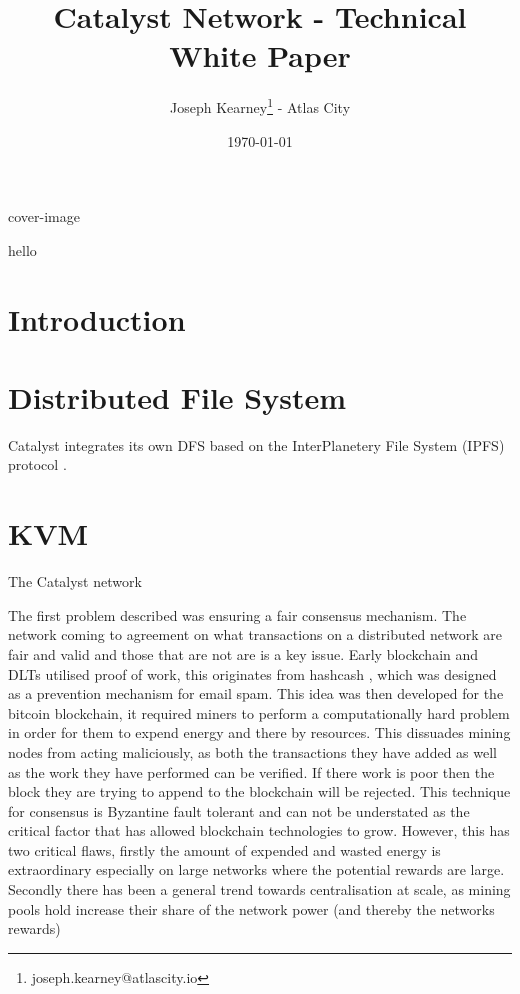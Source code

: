 \documentclass{article}
\title{\textbf{Catalyst Network - Technical White Paper}}
\date{\today}
\author{Joseph Kearney\thanks{joseph.kearney@atlascity.io} - Atlas City}
\begin{document}
 {cover-image}

\maketitle

\abstract 

hello

\newpage

{
  \hypersetup{linkcolor=black}
  \tableofcontents
}
\newpage

\section*{Introduction}

\section{Distributed File System}

Catalyst integrates its own DFS based on the InterPlanetery File System (IPFS) protocol \cite{benet2014ipfs}.

\section{KVM}

The Catalyst network 

The first problem described was ensuring a fair consensus mechanism. The network coming to agreement on what transactions on a distributed network are fair and valid and those that are not are is a key issue. Early blockchain and DLTs utilised proof of work, this originates from hashcash \cite{back2002hashcash}, which was designed as a prevention mechanism for email spam. This idea was then developed for the bitcoin blockchain, it required miners to perform a computationally hard problem in order for them to expend energy and there by resources. This dissuades mining nodes from acting maliciously, as both the transactions they have added as well as the work they have performed can be verified. If there work is poor then the block they are trying to append to the blockchain will be rejected. This technique for consensus is Byzantine fault tolerant and can not be understated as the critical factor that has allowed blockchain technologies to grow. However, this has two critical flaws, firstly the amount of expended and wasted energy is extraordinary especially on large networks where the potential rewards are large. Secondly there has been a general trend towards centralisation at scale, as mining pools hold increase their share of the network power (and thereby the networks rewards) \\
\end{document}
